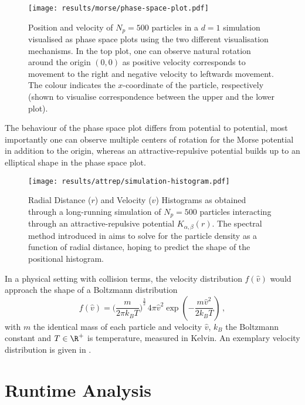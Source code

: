 \begin{figure}[H]
  \centering
  \texttt{[image: results/morse/phase-space-plot.pdf]}
  \caption[Phase Space Plots]{Position and velocity of $N_p = 500$ particles in a $d=1$ simulation visualised as phase space plots using the two different visualisation mechanisms. In the top plot, one can observe natural rotation around the origin $(0, 0)$ as positive velocity corresponds to movement to the right and negative velocity to leftwards movement. The colour indicates the $x$-coordinate of the particle, respectively (shown to visualise correspondence between the upper and the lower plot).}
  \label{fig:phase-space-plot}
\end{figure}

The behaviour of the phase space plot differs from potential to potential, most importantly one can observe multiple centers of rotation for the Morse potential in addition to the origin, whereas an attractive-repulsive potential builds up to an elliptical shape in the phase space plot.

\begin{figure}[H]
  \centering
  \texttt{[image: results/attrep/simulation-histogram.pdf]}
  \caption[Radial Distance and Velocity Histograms of attractive-repulsive Simulation Output in 1D]{Radial Distance ($r$) and Velocity ($v$) Histograms as obtained through a long-running simulation of $N_p = 500$ particles interacting through an attractive-repulsive potential $K_{\alpha, \beta}(r)$. The spectral method introduced in  aims to solve for the particle density as a function of radial distance, hoping to predict the shape of the positional histogram.}
  \label{fig:simulation-histogram}
\end{figure}

In a physical setting with collision terms, the velocity distribution $f(\hat{v})$ would approach the shape of a Boltzmann distribution
$$f(\hat{v})={\bigg(\frac{m}{2\pi k_B T}\bigg)}^{\frac {3}{2}}\,4\pi \hat{v}^{2}\exp \left(-{\frac {m \hat{v}^{2}}{2k_B T}}\right)\,,$$
with $m$ the identical mass of each particle and velocity $\hat{v}$, $k_B$ the Boltzmann constant and $T \in \R^+$ is temperature, measured in Kelvin.
An exemplary velocity distribution is given in .

\section{Runtime Analysis}
\hierKoennteIhreWerbungStehen

